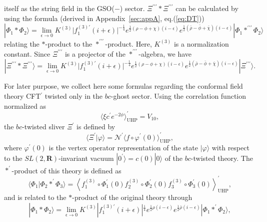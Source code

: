 \documentclass[a4paper,12pt]{article}
\newcommand{\cN}{\mathcal{N}}
\newcommand{\aaru}{\mathbf{R}}
\newcommand{\tp}{\prime\prime\prime}
\begin{document}
itself as the string field in the GSO($-$) sector. 
$\Xi^{\tp}*\Xi^{\tp}$ can be calculated by using the formula 
(derived in Appendix~\ref{sec:appA}, eq.(\ref{eq:DT})) 
\begin{equation}
|\Phi_1*\Phi_2\rangle=\lim_{\epsilon\to 0}K^{(3)}
\Big|f^{(3)\prime}_1(i+\epsilon)\Big|^{-\frac{1}{4}}e^{\frac{1}{2}
(\rho-\phi+\chi)(i-\epsilon)}e^{\frac{1}{2}
(\bar{\rho}-\bar{\phi}+\bar{\chi})(i-\epsilon)}|\Phi_1*^{\tp}\Phi_2\rangle \label{eq:GG}
\end{equation}
relating the $*$-product to the $*^{\tp}$-product. Here, $K^{(3)}$ is a normalization constant. 
Since $\Xi^{\tp}$ is a projector of the $*^{\tp}$-algebra, we have 
\begin{equation}
|\Xi^{\tp}*\Xi^{\tp}\rangle=\lim_{\epsilon\to 0}K^{(3)}
\Big|f^{(3)\prime}_1(i+\epsilon)\Big|^{-\frac{1}{4}}
e^{\frac{1}{2}(\rho-\phi+\chi)(i-\epsilon)}e^{\frac{1}{2}(\bar{\rho}-\bar{\phi}+\bar{\chi})
(i-\epsilon)}|\Xi^{\tp}\rangle. \label{eq:GH}
\end{equation}
\smallskip

For later purpose, we collect here some formulas regarding the conformal field theory CFT$^{\prime}$ 
twisted only in the $bc$-ghost sector. Using the correlation function normalized as 
\[ \langle\xi c^{\prime}e^{-2\phi}\rangle^{\prime}_{\mathrm{UHP}}=V_{10}, \]
the $bc$-twisted sliver $\Xi^{\prime}$ is defined by 
\begin{equation}
\langle\Xi^{\prime}|\varphi\rangle=\cN^{\prime}\langle f\circ\varphi^{\prime}(0)
\rangle^{\prime}_{\mathrm{UHP}}, \label{eq:GQ}
\end{equation}
where $\varphi^{\prime}(0)$ is the vertex operator representation of the state $|\varphi\rangle$ 
with respect to the $SL(2,\aaru)$-invariant vacuum $|0^{\prime}\rangle=c(0)|0\rangle$ of the 
$bc$-twisted theory. The $*^{\prime}$-product of this theory is defined as 
\[ \langle\Phi_1|\Phi_2*^{\prime}\Phi_3\rangle=\left\langle f^{(3)}_1\circ\Phi_1^{\prime}(0)
f^{(3)}_2\circ\Phi_2^{\prime}(0)f^{(3)}_3\circ\Phi_3^{\prime}(0)\right\rangle^{\prime}_{\mathrm{UHP}}, \]
and is related to the $*$-product of the original theory through~\cite{GRSZ1} 
\begin{equation}
|\Phi_1*\Phi_2\rangle=\lim_{\epsilon\to 0}K^{(3)}|f^{(3)\prime}_1(i+\epsilon)|^{\frac{1}{4}}
e^{\frac{1}{2}\rho(i-\epsilon)}e^{\frac{1}{2}\bar{\rho}(i-\epsilon)}|\Phi_1*^{\prime}\Phi_2\rangle, 
\label{eq:GW}
\end{equation}
\end{document}
